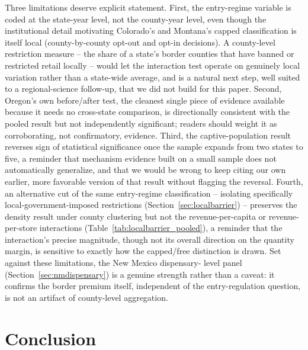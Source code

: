\documentclass[12pt]{article}
\begin{document}
Three limitations deserve explicit statement. First, the entry-regime variable is coded at the state-year
level, not the county-year level, even though the institutional detail motivating Colorado's and Montana's
capped classification is itself local (county-by-county opt-out and opt-in decisions). A county-level
restriction measure -- the share of a state's border counties that have banned or restricted retail locally --
would let the interaction test operate on genuinely local variation rather than a state-wide average, and is a
natural next step, well suited to a regional-science follow-up, that we did not build for this paper. Second,
Oregon's own before/after test, the cleanest single piece of evidence available because it needs no cross-state
comparison, is directionally consistent with the pooled result but not independently significant; readers
should weight it as corroborating, not confirmatory, evidence. Third, the captive-population result reverses
sign of statistical significance once the sample expands from two states to five, a reminder that mechanism
evidence built on a small sample does not automatically generalize, and that we would be wrong to keep citing
our own earlier, more favorable version of that result without flagging the reversal. Fourth, an alternative
cut of the same entry-regime classification -- isolating specifically local-government-imposed restrictions
(Section~\ref{sec:localbarrier}) -- preserves the density result under county clustering but not the
revenue-per-capita or revenue-per-store interactions (Table~\ref{tab:localbarrier_pooled}), a reminder that the
interaction's precise magnitude, though not its overall direction on the quantity margin, is sensitive to
exactly how the capped/free distinction is drawn. Set against these limitations, the New Mexico dispensary-
level panel (Section~\ref{sec:nmdispensary}) is a genuine strength rather than a caveat: it confirms the border
premium itself, independent of the entry-regulation question, is not an artifact of county-level aggregation.

\section{Conclusion}
\label{sec:conclusion}
\end{document}
